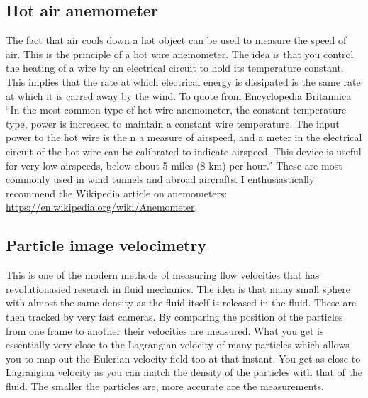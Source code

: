 \subsection{Hot air anemometer}
The fact that air cools down a hot object can be used to measure the
speed of air. This is the principle of a hot wire anemometer. The
idea is that you control the heating of a wire by an electrical
circuit to hold its temperature constant. This implies that the rate
at which electrical energy is dissipated is the same rate at which it
is carred away by the wind. To quote from Encyclopedia Britannica
``In the most common type of hot-wire anemometer,
 the constant-temperature type, power is increased to maintain a
 constant wire temperature. The input power to the hot wire is the
n a measure of airspeed, and a meter in the electrical circuit of the 
hot wire can be calibrated to indicate airspeed. This device is useful
 for very low airspeeds, below about 5 miles (8 km) per hour.''
These are most commonly used in wind tunnels and abroad aircrafts. 
I enthusiastically recommend the Wikipedia article on anemometers:
\url{https://en.wikipedia.org/wiki/Anemometer}. 
\subsection{Particle image velocimetry}
This is one of the modern methods of measuring flow velocities that
has revolutionasied research in fluid mechanics. The idea is that 
many small sphere with almost the same density as the fluid itself is
released in the fluid. These are then tracked by very fast cameras. By
comparing the position of the particles from one frame to another
their velocities are measured. What you get is essentially very close
to the Lagrangian velocity of many particles which allows you to map
out the Eulerian velocity field too at that instant. You get as close
to Lagrangian velocity as you can match the density of the particles
with that of the fluid. The smaller the particles are, more accurate
are the measurements. 
